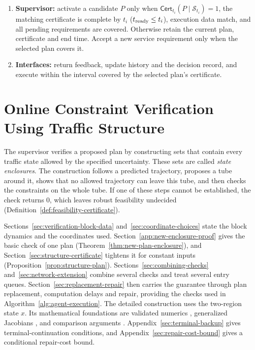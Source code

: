 \documentclass[final]{cas-sc}
\theoremstyle{definition}
\theoremstyle{plain}
\theoremstyle{definition}
\theoremstyle{plain}
\newcommand{\appref}[1]{Appendix~\ref{#1}}
\begin{document}
\begin{algorithm}[!htbp]
\begin{minipage}{\linewidth}
\begin{enumerate}
\eqref{eq:portfolio-cover-rule}. After rejection, invoke repair only if
requested by the agent or enabled automatically. Check every repair
and its backup under the same conditions.
\item\label{step:installation} \textbf{Supervisor:} activate a
candidate $P$ only when $\mathsf{Cert}_{t_i}(P\mid\mathcal S_{t_i})=1$,
the matching certificate is complete by $t_i$
($t_{\rm ready}\le t_i$), execution data match, and all pending
requirements are covered. Otherwise retain the current plan,
certificate and end time. Accept a new service requirement only when
the selected plan covers it.
\item\label{step:feedback} \textbf{Interfaces:} return feedback, update history and the
decision record, and execute within the interval covered by the
selected plan's certificate.
\end{enumerate}
\end{minipage}
\end{algorithm}

\section{Online Constraint Verification Using Traffic Structure}
\label{sec:new-certification}

The supervisor verifies a proposed plan by constructing sets that
contain every traffic state allowed by the specified uncertainty. These
sets are called \emph{state enclosures}. The construction follows a
predicted trajectory, proposes a tube around it, shows that no allowed
trajectory can leave this tube, and then checks the constraints on the
whole tube. If one of these steps cannot be established, the check
returns $0$, which leaves robust feasibility undecided
(Definition~\ref{def:feasibility-certificate}).

Sections~\ref{sec:verification-block-data} and~\ref{sec:coordinate-choices} state the
block dynamics and the coordinates used. Section~\ref{app:new-enclosure-proof}
gives the basic check of one plan (Theorem~\ref{thm:new-plan-enclosure}), and
Section~\ref{sec:structure-certificate} tightens it for constant inputs
(Proposition~\ref{prop:structure-plan}). Sections~\ref{sec:combining-checks}
and~\ref{sec:network-extension} combine several checks and treat several
entry queues. Section~\ref{sec:replacement-repair} then carries the
guarantee through plan replacement, computation delays and repair,
providing the checks used in Algorithm~\ref{alg:agent-execution}.
The detailed construction uses the two-region state $x$. Its
mathematical foundations are validated numerics
\cite{tucker2011validated}, generalized Jacobians
\cite{clarke1990optimization}, and comparison arguments
\cite{khalil2002nonlinear,farina2000positive}. \appref{sec:terminal-backup}
gives terminal-continuation conditions, and \appref{sec:repair-cost-bound}
gives a conditional repair-cost bound.
\end{document}
